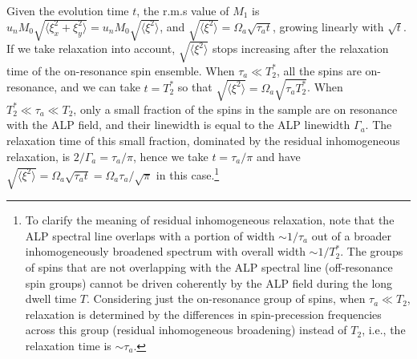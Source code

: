 Given the evolution time $t$, the r.m.s value of $M_1$ is $u_n M_0 \sqrt{\langle \xi_x^2 + \xi_y^2\rangle}  = u_n M_0 \sqrt{\langle \xi^2\rangle} $, 
and $\sqrt{\langle \xi^2\rangle}  = \Omega_{a} \sqrt{\tau_a t}$, growing linearly with $\sqrt{t}$. 
If we take relaxation into account, $\sqrt{\langle \xi^2\rangle} $ stops increasing after the relaxation time of the on-resonance spin ensemble. When $\tau_a \ll T_2^*$, all the spins are on-resonance, and we can take $t= T_2^*$ so that $\sqrt{\langle\xi^2\rangle}=\Omega_{a}\sqrt{\tau_a T_2^*}$. 
When $T_2^* \ll \tau_a \ll T_2$, only a small fraction of the spins in the sample are on resonance with the ALP field, and their linewidth is equal to the ALP linewidth $\Gamma_a$. 
The relaxation time of this small fraction, dominated by the residual inhomogeneous relaxation, is $2/\Gamma_a = \tau_a / \pi$, hence we take $t= \tau_a / \pi$ and have $\sqrt{\langle \xi^2\rangle} = \Omega_{a} \sqrt{\tau_a t} = \Omega_{a} \tau_a /\sqrt{\pi}$ in this case.\footnote{To clarify the meaning of residual inhomogeneous relaxation, note that the ALP spectral line overlaps with a portion of width $\sim1/\tau_a$ out of a broader inhomogeneously broadened spectrum with overall width $\sim1/T_2^*$. 
The groups of spins that are not overlapping with the ALP spectral line (off-resonance spin groups) cannot be driven coherently by the ALP field during the long dwell time $T$. 
Considering just the on-resonance group of spins, when $\tau_a\ll T_2$, relaxation is determined by the differences in spin-precession frequencies across this group (residual inhomogeneous broadening) instead of $T_2$, i.e., the relaxation time is $\sim \tau_a$. } 

